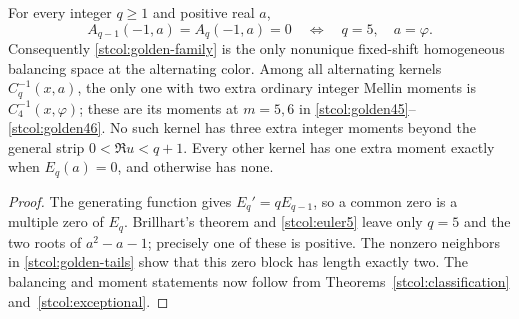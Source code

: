 \begin{corollary}
\label{stcol:alternating-all}
For every integer $q\ge1$ and positive real $a$,
\[
 A_{q-1}(-1,a)=A_q(-1,a)=0
 \quad\Longleftrightarrow\quad q=5,\quad a=\varphi.
\]
Consequently \eqref{stcol:golden-family} is the only nonunique
fixed-shift homogeneous balancing space at the alternating color.
Among all alternating kernels $C_q^{-1}(x,a)$, the only one with
two extra ordinary integer Mellin moments is $C_4^{-1}(x,\varphi)$;
these are its moments at $m=5,6$ in
\eqref{stcol:golden45}--\eqref{stcol:golden46}.  No such kernel has
three extra integer moments beyond the general strip $0<\Re u<q+1$.
Every other kernel has one extra moment exactly when $E_q(a)=0$,
and otherwise has none.
\end{corollary}
\begin{proof}
The generating function gives $E_q'=qE_{q-1}$, so a common zero
is a multiple zero of $E_q$.  Brillhart's theorem and
\eqref{stcol:euler5} leave only $q=5$ and the two roots of
$a^2-a-1$; precisely one of these is positive.  The nonzero
neighbors in \eqref{stcol:golden-tails} show that this zero block
has length exactly two.  The balancing and moment statements
now follow from Theorems~\ref{stcol:classification}
and~\ref{stcol:exceptional}.
\end{proof}

